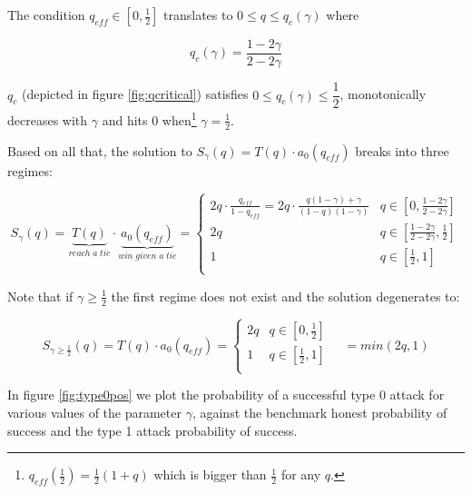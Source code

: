 \documentclass[letterpaper,12pt]{report}
\theoremstyle{plain}
\theoremstyle{definition}
\begin{document}
The condition $q_{eff}\in [0,\frac{1}{2}]$ translates to $0\leq q\leq q_{c}(\gamma)$ where

\begin{equation}\label{qcrit}
q_{c}(\gamma)=\dfrac{1-2\gamma}{2-2\gamma}
\end{equation}

$q_c$ (depicted in figure \ref{fig:qcritical}) satisfies $0 \leq   q_{c}(\gamma) \leq\dfrac{1}{2}$, monotonically decreases with $\gamma$ and hits $0$ when\footnote{$q_{eff}(\frac{1}{2})=\frac{1}{2}(1+q)$ which is bigger than $\frac{1}{2}$ for any $q$.} $\gamma=\frac{1}{2}$.



Based on all that, the solution to $S_\gamma(q)=T(q)\cdot a_0(q_{eff})$ breaks into three regimes:

\begin{equation}\label{sofq}
S_\gamma(q)=\underbrace{T(q)}_{reach\; a\; tie}\cdot \underbrace{a_0(q_{eff})}_{win\;given\;a\;tie}=
\begin{cases}
2q\cdot\frac{q_{eff}}{1-q_{eff}}=2q\cdot\frac{q(1-\gamma)+\gamma}{(1-q)(1-\gamma)} & q\in [0,\frac{1-2\gamma}{2-2\gamma}] \\ 
2q & q\in [\frac{1-2\gamma}{2-2\gamma},\frac{1}{2}] \\ 
1 & q\in [\frac{1}{2},1] \\ 
\end{cases}
\end{equation}

Note that if $\gamma\geq\frac{1}{2}$ the first regime does not exist and the solution degenerates to:

\begin{equation}\label{sofq2}
S_{\gamma\geq\frac{1}{2}}(q)=T(q)\cdot a_0(q_{eff})=
\begin{cases}
2q & q\in [0,\frac{1}{2}] \\ 
1 & q\in [\frac{1}{2},1] \\ 
\end{cases} \quad = min(2q,1)
\end{equation}

In figure \ref{fig:type0pos} we plot the probability of a successful type 0 attack for various values of the parameter $\gamma$, against the benchmark honest probability of success and the type 1 attack probability of success.
\end{document}
